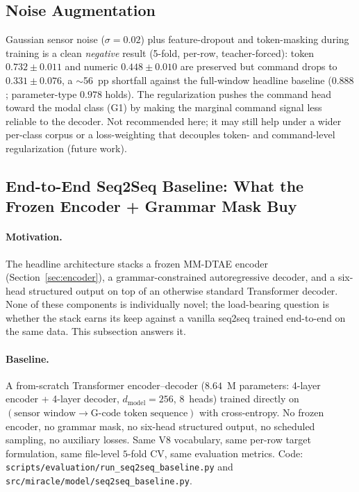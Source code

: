 \documentclass[sensors,article,submit,moreauthors,pdftex]{Definitions/mdpi}
\begin{document}
\subsection{Noise Augmentation}
\label{sec:noise-aug}

Gaussian sensor noise ($\sigma=0.02$) plus feature-dropout and token-masking during training is a clean \emph{negative} result (5-fold, per-row, teacher-forced): token $0.732 \pm 0.011$ and numeric $0.448 \pm 0.010$ are preserved but command drops to $0.331 \pm 0.076$, a $\sim$56~pp shortfall against the full-window headline baseline ($0.888$; parameter-type $0.978$ holds). The regularization pushes the command head toward the modal class (G1) by making the marginal command signal less reliable to the decoder. Not recommended here; it may still help under a wider per-class corpus or a loss-weighting that decouples token- and command-level regularization (future work).

\subsection{End-to-End Seq2Seq Baseline: What the Frozen Encoder + Grammar Mask Buy}
\label{sec:abl-seq2seq-baseline}

\paragraph{Motivation.} The headline architecture stacks a frozen MM-DTAE encoder (Section~\ref{sec:encoder}), a grammar-constrained autoregressive decoder, and a six-head structured output on top of an otherwise standard Transformer decoder. None of these components is individually novel; the load-bearing question is whether the stack earns its keep against a vanilla seq2seq trained end-to-end on the same data. This subsection answers it.

\paragraph{Baseline.} A from-scratch Transformer encoder--decoder ($8.64$~M parameters: 4-layer encoder + 4-layer decoder, $d_{\text{model}}\!=\!256$, $8$~heads) trained directly on $(\text{sensor window}\!\to\!\text{G-code token sequence})$ with cross-entropy. No frozen encoder, no grammar mask, no six-head structured output, no scheduled sampling, no auxiliary losses. Same V8 vocabulary, same per-row target formulation, same file-level $5$-fold CV, same evaluation metrics. Code: \texttt{scripts/evaluation/run\_seq2seq\_baseline.py} and \texttt{src/miracle/model/seq2seq\_baseline.py}.
\end{document}
